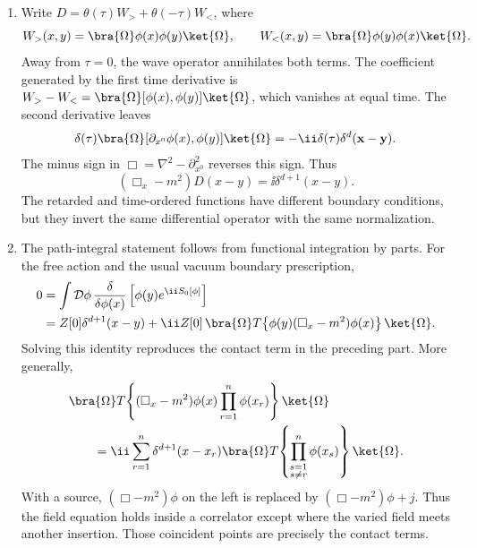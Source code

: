 \begin{enumerate}
\begin{enumerate}
To display the sourced modes explicitly, define
\[
 \widetilde j(t,\mathbf p)
 =\int \dd^d\mathbf y\,e^{-\ii\mathbf p\cdot\mathbf y}j(t,\mathbf y).
\]
The free expansion gives
\[
 D_R(t,\mathbf x)
 =-\ii\theta(t)\int\frac{\dd^d\mathbf p}{(2\pi)^d}\,
 \frac{\sin(\omega_{\mathbf p}t)}{\omega_{\mathbf p}}\,
 e^{\ii\mathbf p\cdot\mathbf x}.
\]
Therefore the complete retarded solution is
\[
\begin{split}
 \phi(x)={}&\phi_0(x)
 +\int\frac{\dd^d\mathbf p}{(2\pi)^d}\,
 e^{\ii\mathbf p\cdot\mathbf x}
 \int_{-\infty}^{x^0}\dd y^0\,
 \frac{\sin[\omega_{\mathbf p}(x^0-y^0)]}{\omega_{\mathbf p}}\,
 \widetilde j(y^0,\mathbf p).
\end{split}
\]
For real \(j\), the response is Hermitian as required.
\item
Write \(D=\theta(\tau)W_>+\theta(-\tau)W_<\), where
\[
 W_>(x,y)=\bra{\Omega}\phi(x)\phi(y)\ket{\Omega},
 \qquad
 W_<(x,y)=\bra{\Omega}\phi(y)\phi(x)\ket{\Omega}.
\]
Away from \(\tau=0\), the wave operator annihilates both terms.  The
coefficient generated by the first time derivative is
\(W_>-W_<=\bra{\Omega}[\phi(x),\phi(y)]\ket{\Omega}\), which vanishes at
equal time.  The second derivative leaves
\[
 \delta(\tau)
 \bra{\Omega}[\partial_{x^0}\phi(x),\phi(y)]\ket{\Omega}
 =-\ii\delta(\tau)\delta^d(\mathbf x-\mathbf y).
\]
The minus sign in
\(\Box=\nabla^2-\partial_{x^0}^2\) reverses this sign.  Thus
\[
 \boxed{\;
 (\Box_x-m^2)D(x-y)=\ii\delta^{d+1}(x-y).
 \;}
\]
The retarded and time-ordered functions have different boundary
conditions, but they invert the same differential operator with the same
normalization.
\item
The path-integral statement follows from functional integration by parts.
For the free action and the usual vacuum boundary prescription,
\[
\begin{split}
 0
 &=\int\mathcal D\phi\,
 \frac{\delta}{\delta\phi(x)}
 \left[\phi(y)e^{\ii S_0[\phi]}\right]\\
 &=Z[0]\delta^{d+1}(x-y)
 +\ii Z[0]\,
 \bra{\Omega}T\!\left\{
 \phi(y)(\Box_x-m^2)\phi(x)\right\}\ket{\Omega}.
\end{split}
\]
Solving this identity reproduces the contact term in the preceding part.
More generally,
\[
\begin{split}
 &\bra{\Omega}T\!\left\{
 (\Box_x-m^2)\phi(x)\prod_{r=1}^{n}\phi(x_r)
 \right\}\ket{\Omega}\\
 &\hspace{2em}
 =\ii\sum_{r=1}^{n}\delta^{d+1}(x-x_r)
 \bra{\Omega}T\!\left\{
 \prod_{\substack{s=1\\s\ne r}}^{n}\phi(x_s)
 \right\}\ket{\Omega}.
\end{split}
\]
With a source, \((\Box-m^2)\phi\) on the left is replaced by
\((\Box-m^2)\phi+j\).  Thus the field equation holds inside a correlator
except where the varied field meets another insertion.  Those coincident
points are precisely the contact terms.
\end{enumerate}


\end{enumerate}

